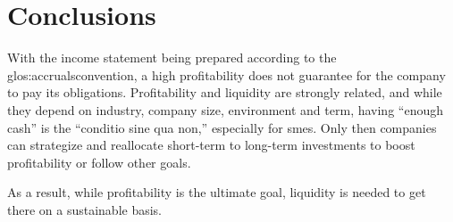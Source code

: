 
\section{Conclusions} \label{sec:Conclusions}
With the income statement being prepared according to the
\gls{glos:accrualsconvention}, a high profitability does not guarantee for the
company to pay its obligations.
Profitability and liquidity are strongly related, and while
they depend on industry, company size, environment and term, having ``enough
cash'' is  the ``conditio sine qua non,'' especially for \glspl{sme}. Only then
companies can strategize and reallocate
 short-term to long-term investments to boost profitability or follow other
 goals.

As a result, while profitability is the ultimate goal, liquidity is needed to
get there on a sustainable basis.




















